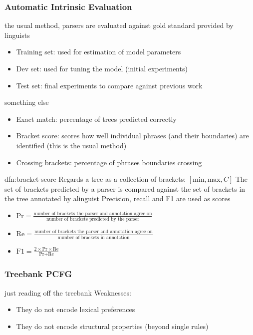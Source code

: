 \documentclass[landscape, 8pt]{extarticle}
\begin{document}
\begin{multicols}{3}
\subsubsection{Automatic Intrinsic Evaluation}
the usual method, parsers are evaluated against gold standard provided by linguists

\begin{itemize}
    \setlength\itemsep{0em}
    \item Training set: used for estimation of model parameters
    \item Dev set: used for tuning the model (initial experiments)
    \item Test set: final experiments to compare against previous work
\end{itemize}

something else
\begin{itemize}
    \setlength\itemsep{0em}
    \item Exact match: percentage of trees predicted correctly
    \item Bracket score: scores how well individual phrases (and their boundaries) are identified (this is the usual method)
    \item Crossing brackets: percentage of phrases boundaries crossing
\end{itemize}

\begin{dfn}{dfn:bracket-score}{}
    Regards a tree as a collection of brackets: $[\text{min}, \text{max}, C]$
    The set of brackets predicted by a parser is compared against the set of brackets in the tree annotated by alinguist
    Precision, recall and F1 are used as scores
    \begin{itemize}
        \setlength\itemsep{0em}
        \item $\text{Pr} = \displaystyle\frac{\text{number of brackets the parser and annotation agree on}}{\text{number of brackets predicted by the parser}}$
        \item $\text{Re} = \displaystyle\frac{\text{number of brackets the parser and annotation agree on}}{\text{number of brackets in annotation}}$
        \item $\text{F1} = \displaystyle\frac{2 \times \text{Pr} \times \text{Re}}{\text{Pr} + \text{Re}}$
    \end{itemize}
\end{dfn}

\subsubsection{Treebank PCFG}
just reading off the treebank
Weaknesses:
\begin{itemize}
    \setlength\itemsep{0em}
    \item They do not encode lexical preferences
    \item They do not encode structural properties (beyond single rules)
\end{itemize}


\end{multicols}
\end{document}
